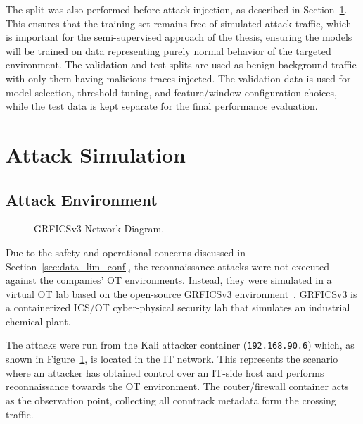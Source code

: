 The split was also performed before attack injection, as described in Section~\ref{sec:attack_injection}. This ensures that the training set remains free of simulated attack traffic, which is important for the semi-supervised approach of the thesis, ensuring the models will be trained on data representing purely normal behavior of the targeted environment. The validation and test splits are used as benign background traffic with only them having malicious traces injected. The validation data is used for model selection, threshold tuning, and feature/window configuration choices, while the test data is kept separate for the final performance evaluation.





\section{Attack Simulation}
\label{sec:attack_injection}
\subsection{Attack Environment}


\begin{figure}[htbp]
    \centering
    
    \resizebox{\textwidth}{!}{%
        
    }
    \caption{GRFICSv3 Network Diagram.}
    \label{fig:env_diagram}
\end{figure}


Due to the safety and operational concerns discussed in Section~\ref{sec:data_lim_conf}, the reconnaissance attacks were not executed against the companies' OT environments. Instead, they were simulated in a virtual OT lab based on the open-source GRFICSv3 environment~\cite{grficsv3_2026}. GRFICSv3 is a containerized ICS/OT cyber-physical security lab that simulates an industrial chemical plant.

The attacks were run from the Kali attacker container (\texttt{192.168.90.6}) which, as shown in Figure~\ref{fig:env_diagram}, is located in the IT network. This represents the scenario where an attacker has obtained control over an IT-side host and performs reconnaissance towards the OT environment. The router/firewall container acts as the observation point, collecting all conntrack metadata form the crossing traffic.



